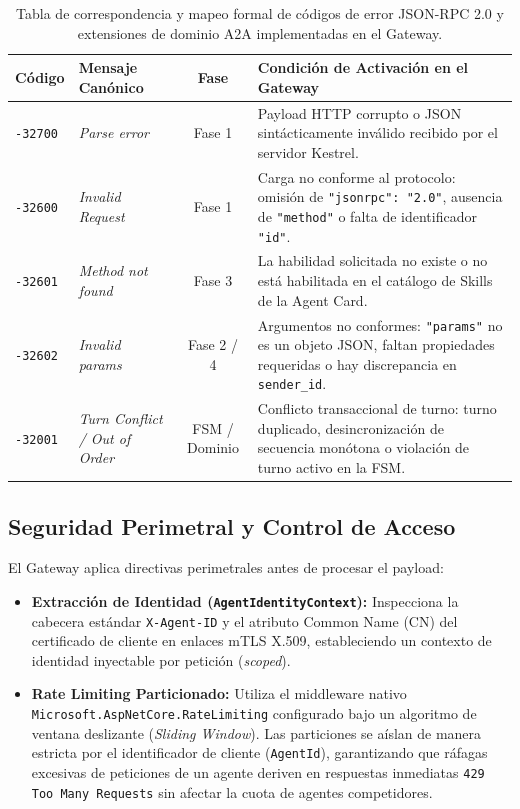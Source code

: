 \begin{table}[htbp]
    \centering
    \small
    \renewcommand{\arraystretch}{1.3}
    \begin{tabular}{@{}llcp{7.5cm}@{}}
        \toprule
        \textbf{Código} & \textbf{Mensaje Canónico} & \textbf{Fase} & \textbf{Condición de Activación en el Gateway} \\
        \midrule
        \texttt{-32700} & \textit{Parse error} & Fase 1 & Payload HTTP corrupto o JSON sintácticamente inválido recibido por el servidor Kestrel. \\
        \texttt{-32600} & \textit{Invalid Request} & Fase 1 & Carga no conforme al protocolo: omisión de \texttt{"jsonrpc": "2.0"}, ausencia de \texttt{"method"} o falta de identificador \texttt{"id"}. \\
        \texttt{-32601} & \textit{Method not found} & Fase 3 & La habilidad solicitada no existe o no está habilitada en el catálogo de Skills de la Agent Card. \\
        \texttt{-32602} & \textit{Invalid params} & Fase 2 / 4 & Argumentos no conformes: \texttt{"params"} no es un objeto JSON, faltan propiedades requeridas o hay discrepancia en \texttt{sender\_id}. \\
        \texttt{-32001} & \textit{Turn Conflict / Out of Order} & FSM / Dominio & Conflicto transaccional de turno: turno duplicado, desincronización de secuencia monótona o violación de turno activo en la FSM. \\
        \bottomrule
    \end{tabular}
    \caption{Tabla de correspondencia y mapeo formal de códigos de error JSON-RPC 2.0 y extensiones de dominio A2A implementadas en el Gateway.}
    \label{tab:jsonrpc_error_mapping}
\end{table}

\subsection{Seguridad Perimetral y Control de Acceso}
El Gateway aplica directivas perimetrales antes de procesar el payload:
\begin{itemize}
    \item \textbf{Extracción de Identidad (\texttt{AgentIdentityContext}):} Inspecciona la cabecera estándar \texttt{X-Agent-ID} y el atributo Common Name (CN) del certificado de cliente en enlaces mTLS X.509, estableciendo un contexto de identidad inyectable por petición (\textit{scoped}).
    \item \textbf{Rate Limiting Particionado:} Utiliza el middleware nativo \texttt{Microsoft.AspNetCore.RateLimiting} configurado bajo un algoritmo de ventana deslizante (\textit{Sliding Window}). Las particiones se aíslan de manera estricta por el identificador de cliente (\texttt{AgentId}), garantizando que ráfagas excesivas de peticiones de un agente deriven en respuestas inmediatas \texttt{429 Too Many Requests} sin afectar la cuota de agentes competidores.
\end{itemize}

